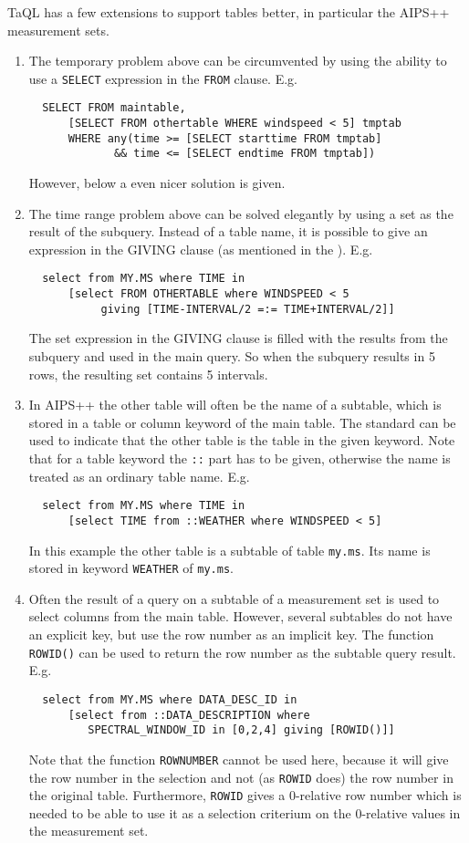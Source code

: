 TaQL has a few extensions to support tables better,
in particular the AIPS++ measurement sets.
\begin{enumerate}
\item
The temporary problem above can be circumvented by using the
ability to use a \texttt{SELECT} expression in the \texttt{FROM}
clause. E.g.
\begin{verbatim}
  SELECT FROM maintable,
      [SELECT FROM othertable WHERE windspeed < 5] tmptab
      WHERE any(time >= [SELECT starttime FROM tmptab]
             && time <= [SELECT endtime FROM tmptab])
\end{verbatim}
However, below a even nicer solution is given. 

\item
The time range problem above can be solved elegantly by using
a set as the result of the subquery. Instead of a table name,
it is possible to give an expression in the GIVING clause (as mentioned
in the ). E.g.
\begin{verbatim}
  select from MY.MS where TIME in
      [select FROM OTHERTABLE where WINDSPEED < 5
           giving [TIME-INTERVAL/2 =:= TIME+INTERVAL/2]]
\end{verbatim}
The set expression in the GIVING clause is filled with the
results from the subquery and used in the main query. So when
the subquery results in 5 rows, the resulting set contains 5
intervals.

\item
In AIPS++ the other table will often be the name of a subtable,
which is stored in a table or column keyword of the main table.
The standard  can be used
to indicate that the other table is the table in the given keyword.
Note that for a table keyword the \texttt{::} part has to be given,
otherwise the name is treated as an ordinary table name. E.g.
\begin{verbatim}
  select from MY.MS where TIME in
      [select TIME from ::WEATHER where WINDSPEED < 5]
\end{verbatim}
In this example the other table is a subtable of table \texttt{my.ms}.
Its name is stored in keyword \texttt{WEATHER} of \texttt{my.ms}.

\item
Often the result of a query on a subtable of a measurement set is
used to select columns from the main table. However, several
subtables do not have an explicit key, but use the row number as
an implicit key. The function \texttt{ROWID()} can be used to
return the row number as the subtable query result. E.g.
\begin{verbatim}
  select from MY.MS where DATA_DESC_ID in
      [select from ::DATA_DESCRIPTION where
         SPECTRAL_WINDOW_ID in [0,2,4] giving [ROWID()]] 
\end{verbatim}
Note that the function \texttt{ROWNUMBER} cannot be used here,
because it will give the row number in the selection and not
(as \texttt{ROWID} does) the row number in the original table.
Furthermore, \texttt{ROWID} gives a 0-relative row number which is
needed to be able to use it as a selection criterium on the 0-relative
values in the measurement set.
\end{enumerate}


